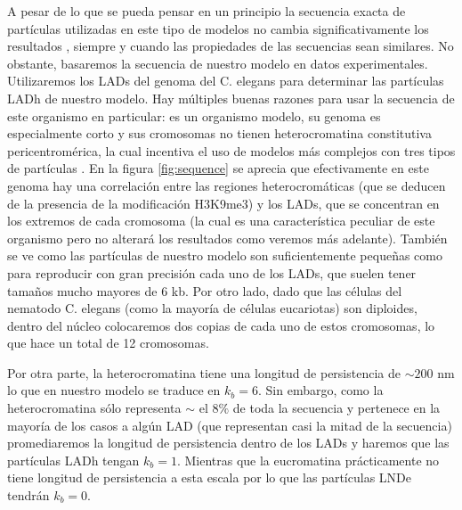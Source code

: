 A pesar de lo que se pueda pensar en un principio la secuencia exacta de partículas utilizadas en este tipo de modelos no cambia significativamente los resultados \cite{Bajpai2021}, siempre y cuando las propiedades de las secuencias sean similares. No obstante, basaremos la secuencia de nuestro modelo en datos experimentales. Utilizaremos los LADs del genoma del C. elegans \cite{Ho2014,C.elegans1998} para determinar las partículas LADh de nuestro modelo. Hay múltiples buenas razones para usar la secuencia de este organismo en particular: es un organismo modelo, su genoma es especialmente corto y sus cromosomas no tienen heterocromatina constitutiva pericentromérica, la cual incentiva el uso de modelos más complejos con tres tipos de partículas \cite{Falk2019}. En la figura \ref{fig:sequence} se aprecia que efectivamente en este genoma hay una correlación entre las regiones heterocromáticas (que se deducen de la presencia de la modificación H3K9me3) y los LADs, que se concentran en los extremos de cada cromosoma (la cual es una característica peculiar de este organismo pero no alterará los resultados como veremos más adelante). También se ve como las partículas de nuestro modelo son suficientemente pequeñas como para reproducir con gran precisión cada uno de los LADs, que suelen tener tamaños mucho mayores de 6 kb. Por otro lado, dado que las células del nematodo C. elegans (como la mayoría de células eucariotas) son diploides, dentro del núcleo colocaremos dos copias de cada uno de estos cromosomas, lo que hace un total de 12 cromosomas.

Por otra parte, la heterocromatina tiene una longitud de persistencia de $\sim200$ nm \cite{Bystricky2004} lo que en nuestro modelo se traduce en $k_b=6$. Sin embargo, como la heterocromatina sólo representa $\sim$ el $8\%$ de toda la secuencia y pertenece en la mayoría de los casos a algún LAD (que representan casi la mitad de la secuencia) promediaremos la longitud de persistencia dentro de los LADs y haremos que las partículas LADh tengan $k_b=1$. Mientras que la eucromatina prácticamente no tiene longitud de persistencia a esta escala por lo que las partículas LNDe tendrán $k_b=0$.

